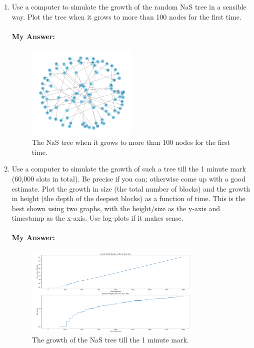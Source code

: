 \documentclass{article}
\begin{document}
\begin{enumerate}[label=(\alph*)]
    \item Use a computer to simulate the growth of the random NaS tree in a sensible way.  Plot the tree when it grows to more than 100 nodes for the first time.
        \paragraph*{My Answer:}
        
        \begin{figure}[h]
            \centering
            \includegraphics*[width=0.5\textwidth]{NaS_tree.png}
            \caption{The NaS tree when it grows to more than 100 nodes for the first time.}
        \end{figure}
    \item Use a computer to simulate the growth of such a tree till the 1 minute mark (60,000 slots in total).  Be precise if you can; otherwise come up with a good estimate.  Plot the growth in size (the total number of blocks) and the growth in height (the depth of the deepest blocks) as a function of time.  This is the best shown using two graphs, with the height/size as the y-axis and timestamp as the x-axis.  Use log-plots if it makes sense.
        \paragraph*{My Answer:}
        
        \begin{figure}[h]
            \centering
            \includegraphics*[width=0.8\textwidth]{tree_growth.png}
            \caption{The growth of the NaS tree till the 1 minute mark.}
        \end{figure}
\end{enumerate}
\end{document}
